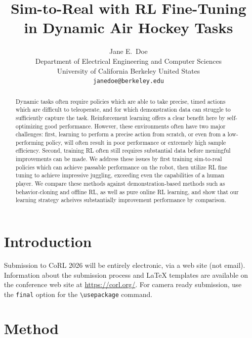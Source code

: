 \documentclass{article}
\title{Sim-to-Real with RL Fine-Tuning in Dynamic Air Hockey Tasks}
\author{
  Jane E.~Doe\\
  Department of Electrical Engineering and Computer Sciences\\
  University of California Berkeley
  United States\\
  \texttt{janedoe@berkeley.edu} \\
}
\begin{document}
\maketitle


\begin{abstract}
    Dynamic tasks often require policies which are able to take precise, timed actions which are difficult to teleoperate, and for which demonstration data can struggle to sufficiently capture the task. Reinforcement learning offers a clear benefit here by self-optimizing good performance. However, these environments often have two major challenges: first, learning to perform a precise action from scratch, or even from a low-performing policy, will often result in poor performance or extremely high sample efficiency. Second, training RL often still requires substantial data before meningful improvements can be made. We address these issues by first training sim-to-real policies which can achieve passable performance on the robot, then utilize RL fine tuning to achieve impressive juggling, exceeding even the capabilities of a human player. We compare these methods against demonstration-based methods such as behavior-cloning and offline RL, as well as pure online RL learning, and show that our learning strategy acheives substantially improvement performance by comparison.
\end{abstract}



\section{Introduction}

    Submission to CoRL 2026 will be entirely electronic, via a web site (not email). Information about the submission process and \LaTeX{} templates are available on the conference web site at \url{https://corl.org/}. For camera ready submission, use the \texttt{final} option for the \texttt{\textbackslash usepackage} command.


\section{Method}
\label{sec:method}
\end{document}
